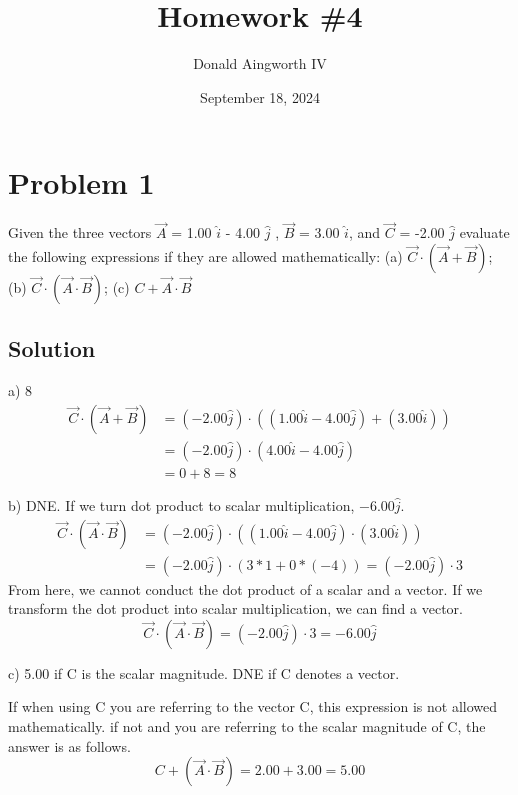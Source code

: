 \documentclass[12pt]{article}
\title{Homework \#4}
\author{Donald Aingworth IV}
\date{September 18, 2024}
\begin{document}

\maketitle

\section*{Problem 1}
Given the three vectors $\vec{A}$ = 1.00 $\hat{i}$ - 4.00 $\hat{j}$ , $\vec{B}$ = 3.00 $\hat{i}$, and $\vec{C}$ = -2.00 $\hat{j}$ evaluate the following expressions if they are allowed mathematically: (a) $\vec{C} \cdot (\vec{A} + \vec{B})$; (b) $\vec{C} \cdot ( \vec{A} \cdot \vec{B} )$; (c) $ C + \vec{A} \cdot \vec{B} $

\subsection*{Solution}
a) 8
\begin{align*}
    \vec{C} \cdot (\vec{A} + \vec{B}) &= (-2.00 \hat{j}) \cdot ((1.00 \hat{i} - 4.00 \hat{j}) + (3.00 \hat{i}))\\
        &= (-2.00 \hat{j}) \cdot (4.00 \hat{i} - 4.00 \hat{j})\\
        &= 0 + 8 = \boxed{8}
\end{align*}

b) DNE. If we turn dot product to scalar multiplication, $-6.00 \hat{j}$.
\begin{align*}
    \vec{C} \cdot ( \vec{A} \cdot \vec{B} ) &= (-2.00 \hat{j}) \cdot ((1.00 \hat{i} - 4.00 \hat{j}) \cdot (3.00 \hat{i}))\\
        &= (-2.00 \hat{j}) \cdot (3*1 + 0*(-4)) = (-2.00 \hat{j}) \cdot 3
\end{align*}
From here, we cannot conduct the dot product of a scalar and a vector. If we transform the dot product into scalar multiplication, we can find a vector.
\begin{equation*}
    \vec{C} \cdot ( \vec{A} \cdot \vec{B} ) = (-2.00 \hat{j}) \cdot 3 = \boxed{-6.00 \hat{j}}
\end{equation*}

c) 5.00 if C is the scalar magnitude. DNE if C denotes a vector.

If when using C you are referring to the vector C, this expression is not allowed mathematically. if not and you are referring to the scalar magnitude of C, the answer is as follows.
\begin{equation*}
    C + ( \vec{A} \cdot \vec{B} ) = 2.00 + 3.00 = \boxed{5.00}
\end{equation*}
\end{document}
